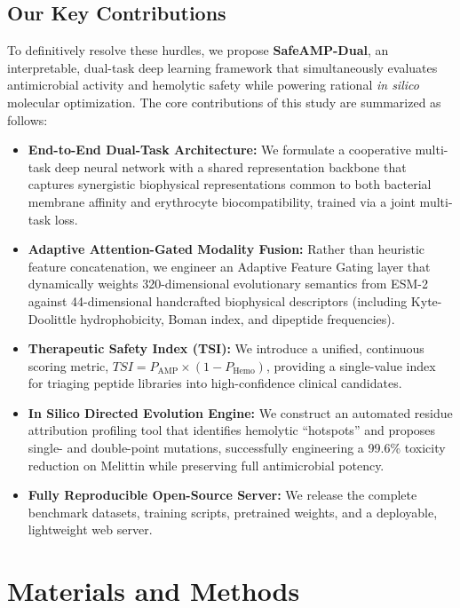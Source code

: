 \documentclass[11pt,a4paper]{article}
\begin{document}
\subsection{Our Key Contributions}
To definitively resolve these hurdles, we propose \textbf{SafeAMP-Dual}, an interpretable, dual-task deep learning framework that simultaneously evaluates antimicrobial activity and hemolytic safety while powering rational \textit{in silico} molecular optimization. The core contributions of this study are summarized as follows:
\begin{itemize}
    \item \textbf{End-to-End Dual-Task Architecture:} We formulate a cooperative multi-task deep neural network with a shared representation backbone that captures synergistic biophysical representations common to both bacterial membrane affinity and erythrocyte biocompatibility, trained via a joint multi-task loss.
    \item \textbf{Adaptive Attention-Gated Modality Fusion:} Rather than heuristic feature concatenation, we engineer an Adaptive Feature Gating layer that dynamically weights 320-dimensional evolutionary semantics from ESM-2 against 44-dimensional handcrafted biophysical descriptors (including Kyte-Doolittle hydrophobicity, Boman index, and dipeptide frequencies).
    \item \textbf{Therapeutic Safety Index (TSI):} We introduce a unified, continuous scoring metric, $TSI = P_{\text{AMP}} \times (1 - P_{\text{Hemo}})$, providing a single-value index for triaging peptide libraries into high-confidence clinical candidates.
    \item \textbf{In Silico Directed Evolution Engine:} We construct an automated residue attribution profiling tool that identifies hemolytic ``hotspots'' and proposes single- and double-point mutations, successfully engineering a 99.6\% toxicity reduction on Melittin while preserving full antimicrobial potency.
    \item \textbf{Fully Reproducible Open-Source Server:} We release the complete benchmark datasets, training scripts, pretrained weights, and a deployable, lightweight web server.
\end{itemize}

\newpage

\section{Materials and Methods}
\end{document}
